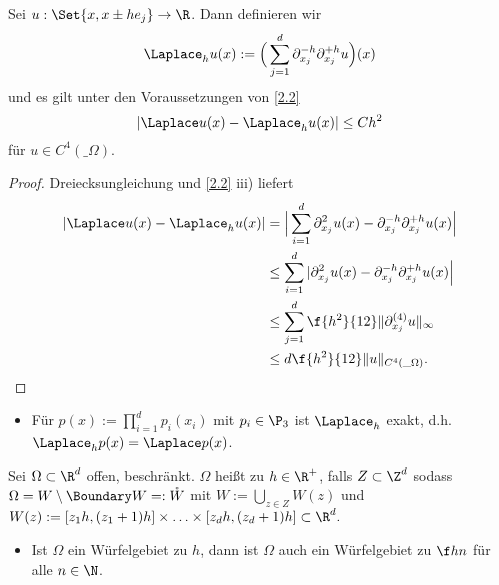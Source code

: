 \begin{kor} \label{2.3}
	Sei $u : \Set{x, x \pm h e_j} \to \R$.
	Dann definieren wir
	\begin{equation} \label{eq:2.1}
		\Laplace_h u(x) :=
		\Big(\sum_{j=1}^d \partial_{x_j}^{-h} \partial_{x_j}^{+h} u \Big) (x)
	\end{equation}
	und es gilt unter den Voraussetzungen von \ref{2.2}
	\[
		|\Laplace u(x) - \Laplace_h u(x)| \le C h^2
	\]
	für $u \in C^4(\_\Omega)$.
	\begin{proof}
		Dreiecksungleichung und \ref{2.2} iii) liefert
		\begin{align*}
			|\Laplace u(x) - \Laplace_h u(x)|
			&= \Big| \sum_{i=1}^d \partial_{x_j}^2 u(x) - \partial_{x_j}^{-h} \partial_{x_j}^{+h} u(x) \Big| \\
			&\le \sum_{i=1}^d | \partial_{x_j}^2 u(x) - \partial_{x_j}^{-h} \partial_{x_j}^{+h} u(x) \Big| \\
			&\le \sum_{j=1}^d \f {h^2}{12} \|\partial_{x_j}^{(4)} u\|_\infty \\
			&\le d \f {h^2}{12} \|u\|_{C^4(\_\Omega)}.
		\end{align*}
	\end{proof}
	\begin{note}
		\begin{itemize}
			\item
				Für $p(x) := \prod_{i=1}^d p_i(x_i)$ mit $p_i \in \P_3$ ist $\Laplace_h$ exakt, d.h. $\Laplace_h p(x) = \Laplace p(x)$.
		\end{itemize}
	\end{note}
\end{kor}


\begin{df}[Würfelgebiet] \label{2.4}
	Sei $\Omega \subset \R^d$ offen, beschränkt.
	$\Omega$ heißt  zu $h \in \R^+$, falls $Z \subset \Z^d$ sodass $\Omega = W \setminus \Boundary W =: \mathring W$ mit $W := \bigcup_{z \in Z} W(z)$ und
	\begin{math}
		W(z) := [z_1h , (z_1+1)h] \times \dotsc \times [z_d h, (z_d+1)h] \subset \R^d.
	\end{math}
	\begin{note}
		\begin{itemize}
			\item
				Ist $\Omega$ ein Würfelgebiet zu $h$, dann ist $\Omega$ auch ein Würfelgebiet zu $\f hn$ für alle $n \in \N$.
		\end{itemize}
	\end{note}
\end{df}

